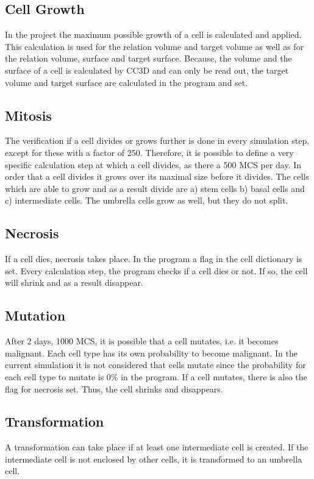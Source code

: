 \subsection{Cell Growth}
In the project the maximum possible growth of a cell is calculated and applied. This calculation is used for the relation volume and target volume as well as for the relation volume, surface and target surface. Because, the volume and the surface of a cell is calculated by \ac{CC3D} and can only be read out, the target volume and target surface are calculated in the program and set.

\subsection{Mitosis}
The verification if a cell divides or grows further is done in every simulation step, except for these with a factor of 250. Therefore, it is possible to define a very specific calculation step at which a cell divides, as there a 500 \ac{MCS} per day. In order that a cell divides it grows over its maximal size before it divides.
The cells which are able to grow and as a result divide are a) stem cells b) basal cells and c) intermediate cells. The umbrella cells grow as well, but they do not split.

\subsection{Necrosis}
If a cell dies, necrosis takes place. In the program a flag in the cell dictionary is set. Every calculation step, the program checks if a cell dies or not. If so, the cell will shrink and as a result disappear.

\subsection{Mutation}
After 2 days, 1000 \ac{MCS}, it is possible that a cell mutates, i.e. it becomes malignant. Each cell type has its own probability to become malignant. In the current simulation it is not considered that cells mutate since the probability for each cell type to mutate is 0\% in the program. \newline
If a cell mutates, there is also the flag for necrosis set. Thus, the cell shrinks and disappears.

\subsection{Transformation}
A transformation can take place if at least one intermediate cell is created. If the intermediate cell is not enclosed by other cells, it is transformed to an umbrella cell.

